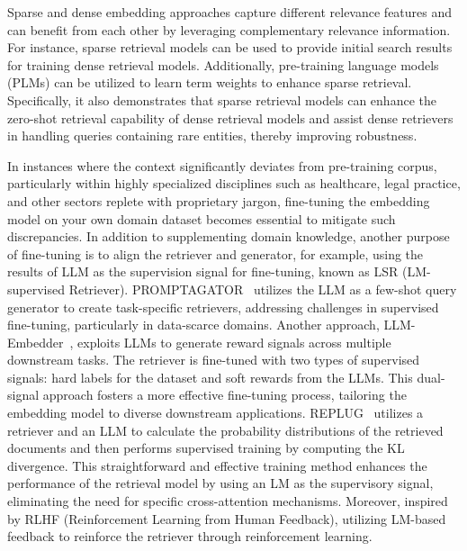 Sparse and dense embedding approaches capture different relevance features and can benefit from each other by leveraging complementary relevance information. For instance, sparse retrieval models can be used to provide initial search results for training dense retrieval models. Additionally, pre-training language models (PLMs) can be utilized to learn term weights to enhance sparse retrieval. Specifically, it also demonstrates that sparse retrieval models can enhance the zero-shot retrieval capability of dense retrieval models and assist dense retrievers in handling queries containing rare entities, thereby improving robustness.

In instances where the context significantly deviates from pre-training corpus, particularly within highly specialized disciplines such as healthcare, legal practice, and other sectors replete with proprietary jargon, fine-tuning the embedding model on your own domain dataset becomes essential to mitigate such discrepancies.
In addition to supplementing domain knowledge, another purpose of fine-tuning is to align the retriever and generator, for example, using the results of LLM as the supervision signal for fine-tuning, known as LSR (LM-supervised Retriever). PROMPTAGATOR~ utilizes the LLM as a few-shot query generator to create task-specific retrievers, addressing challenges in supervised fine-tuning, particularly in data-scarce domains. Another approach, LLM-Embedder~, exploits LLMs to generate reward signals across multiple downstream tasks. The retriever is fine-tuned with two types of supervised signals: hard labels for the dataset and soft rewards from the LLMs. This dual-signal approach fosters a more effective fine-tuning process, tailoring the embedding model to diverse downstream applications. REPLUG~ utilizes a retriever and an LLM to calculate the probability distributions of the retrieved documents and then performs supervised training by computing the KL divergence. This straightforward and effective training method enhances the performance of the retrieval model by using an LM as the supervisory signal, eliminating the need for specific cross-attention mechanisms. Moreover, inspired by RLHF (Reinforcement Learning from Human Feedback), utilizing LM-based feedback to reinforce the retriever through reinforcement learning.

